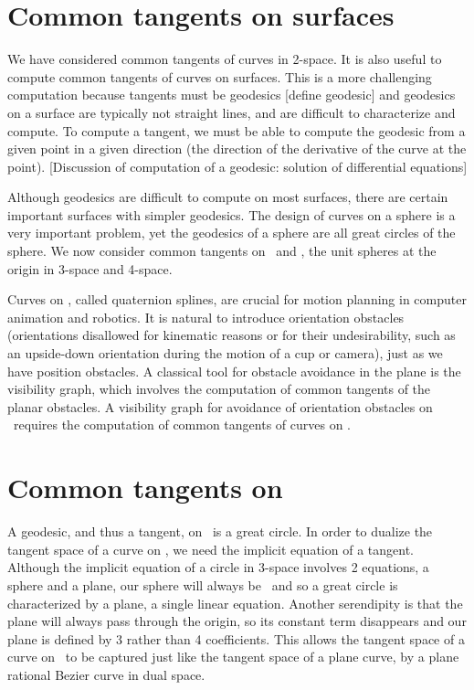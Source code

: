 \documentclass[11pt]{article}
\begin{document}
\section{Common tangents on surfaces}

We have considered common tangents of curves in 2-space.
It is also useful to compute common tangents of curves on surfaces.
This is a more challenging computation 
because tangents must be geodesics [define geodesic] and 
geodesics on a surface are typically not straight lines, and are difficult
to characterize and compute.
To compute a tangent, we must be able to compute the geodesic
from a given point in a given direction (the direction of the derivative
of the curve at the point).
[Discussion of computation of a geodesic: solution of differential equations]

Although geodesics are difficult to compute on most surfaces,
there are certain important surfaces with simpler geodesics.
The design of curves on a sphere is a very important problem,
yet the geodesics of a sphere are all great circles of the sphere.
We now consider common tangents on \ and , the unit spheres 
at the origin in 3-space and 4-space.

Curves on , called quaternion splines, are crucial for motion planning
in computer animation and robotics.
It is natural to introduce orientation obstacles (orientations disallowed for
kinematic reasons or for their undesirability, such as an upside-down 
orientation during the motion of a cup or camera), just as we have position
obstacles.
A classical tool for obstacle avoidance in the plane is the visibility graph,
which involves the computation of common tangents of the planar obstacles.
A visibility graph for avoidance of orientation obstacles on \
requires the computation of common tangents of curves on .

\section{Common tangents on }

A geodesic, and thus a tangent, on \ is a great circle.
In order to dualize the tangent space of a curve on \Sn{2},
we need the implicit equation of a tangent.
Although the implicit equation of a circle in 3-space involves 2 equations,
a sphere and a plane, our sphere will always be \Sn{2}\ and so 
a great circle is characterized by a plane, a single linear equation.
Another serendipity is that the plane will always pass through the origin,
so its constant term disappears and our plane is defined by 3 rather than
4 coefficients.
This allows the tangent space of a curve on \ to be captured just 
like the tangent space of a plane curve, by a plane rational Bezier curve 
in dual space.
\end{document}
